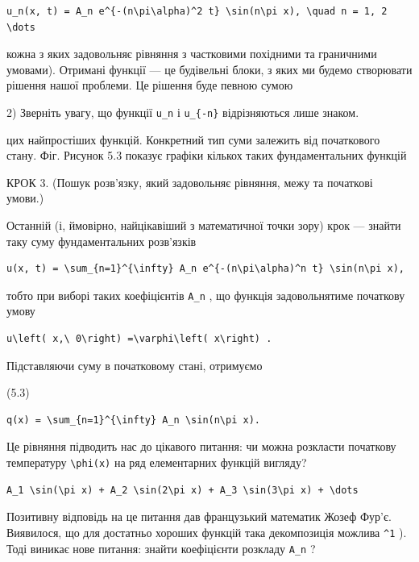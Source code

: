 \documentclass[
  ukrainian,
]{article}
\begin{document}
\begin{verbatim}
u_n(x, t) = A_n e^{-(n\pi\alpha)^2 t} \sin(n\pi x), \quad n = 1, 2 \dots
\end{verbatim}

кожна з яких задовольняє рівняння з частковими похідними та граничними
умовами). Отримані функції --- це будівельні блоки, з яких ми будемо
створювати рішення нашої проблеми. Це рішення буде певною сумою

2) Зверніть увагу, що функції \texttt{u\_n} і \texttt{u\_\{-n\}}
відрізняються лише знаком.

цих найпростіших функцій. Конкретний тип суми залежить від початкового
стану. Фіг. Рисунок 5.3 показує графіки кількох таких фундаментальних
функцій

КРОК 3. (Пошук розв'язку, який задовольняє рівняння, межу та початкові
умови.)

Останній (і, ймовірно, найцікавіший з математичної точки зору) крок ---
знайти таку суму фундаментальних розв'язків

\begin{verbatim}
u(x, t) = \sum_{n=1}^{\infty} A_n e^{-(n\pi\alpha)^n t} \sin(n\pi x),
\end{verbatim}

тобто при виборі таких коефіцієнтів \texttt{A\_n} , що функція
задовольнятиме початкову умову

\begin{verbatim}
u\left( x,\ 0\right) =\varphi\left( x\right) .
\end{verbatim}

Підставляючи суму в початковому стані, отримуємо

(5.3)

\begin{verbatim}
q(x) = \sum_{n=1}^{\infty} A_n \sin(n\pi x).
\end{verbatim}

Це рівняння підводить нас до цікавого питання: чи можна розкласти
початкову температуру \texttt{\textbackslash{}phi(x)} на ряд
елементарних функцій вигляду?

\begin{verbatim}
A_1 \sin(\pi x) + A_2 \sin(2\pi x) + A_3 \sin(3\pi x) + \dots
\end{verbatim}

Позитивну відповідь на це питання дав французький математик Жозеф Фур'є.
Виявилося, що для достатньо хороших функцій така декомпозиція можлива
\texttt{\^{}1} ). Тоді виникає нове питання: знайти коефіцієнти розкладу
\texttt{A\_n} ?
\end{document}
